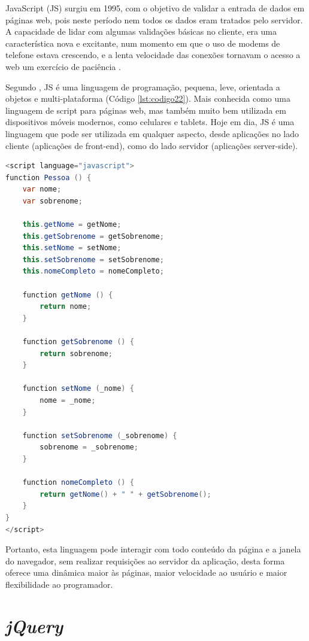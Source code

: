 JavaScript (JS) surgiu em 1995, com o objetivo de validar a entrada de dados em páginas web, pois neste período nem todos os dados eram tratados pelo servidor. A capacidade de lidar com algumas validações básicas no cliente, era uma característica nova e excitante, num momento em que o uso de modems de telefone estava crescendo, e a lenta velocidade das conexões tornavam o acesso a web um exercício de paciência \cite{ZAKAS}.

Segundo , JS é uma linguagem de programação, pequena, leve, orientada a objetos e multi-plataforma (Código \ref{lst:codigo22}). Mais conhecida como uma linguagem de script para páginas web, mas também muito bem utilizada em dispositivos móveis modernos, como celulares e tablets. Hoje em dia, JS é uma linguagem que pode ser utilizada em qualquer aspecto, desde aplicações no lado cliente (aplicações de front-end), como do lado servidor (aplicações server-side).

{\singlespace
\begin{lstlisting}[caption=Classe Pessoa em \textit{JavaScript},language=Java,label={lst:codigo22}]
<script language="javascript">
function Pessoa () {
    var nome;
    var sobrenome;
    
    this.getNome = getNome;
    this.getSobrenome = getSobrenome;
    this.setNome = setNome;
    this.setSobrenome = setSobrenome;
    this.nomeCompleto = nomeCompleto;
    
    function getNome () {
        return nome;
    }
    
    function getSobrenome () {
        return sobrenome;
    }
    
    function setNome (_nome) {
        nome = _nome;
    }
    
    function setSobrenome (_sobrenome) {
        sobrenome = _sobrenome;
    }
    
    function nomeCompleto () {
        return getNome() + " " + getSobrenome();
    }
}
</script>
\end{lstlisting}
}

Portanto, esta linguagem pode interagir com todo conteúdo da página e a janela do navegador, sem realizar requisições ao servidor da aplicação, desta forma oferece uma dinâmica maior às páginas, maior velocidade ao usuário e maior flexibilidade ao programador.

\section{\textit{jQuery}}
\label{sec:jquery}

